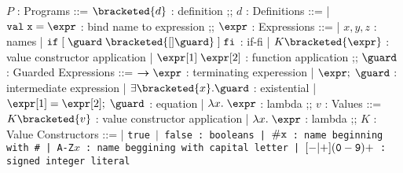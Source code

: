 \documentclass[]{article}
\begin{document}
\begin{center}
    \begin{bnf}
    $P$ : \textsf{Programs} ::=
    $\bracketed{d}$ : definition
    ;;
    $d$ : \textsf{Definitions} ::=
    | $\tt{val} \; x \; \tt{=} \; \expr$ : bind name to expression
    ;;
    $\expr$ : \textsf{Expressions} ::=
    | $x, y, z$ : names
    | $\tt{if} \; \tt{[}\; \guard \; \bracketed{[] \guard} \;\tt{]} \; \tt{fi}$ : if-fi 
    | $K \bracketed{\expr}$ : value constructor application 
    | $\expr[1] \; \expr[2]$ : function application 
    ;;
    $\guard$ : \textsf{Guarded Expressions} ::=  
    $\boldsymbol{\rightarrow}\expr$ : terminating experession
    | $\expr; \; \guard$ : intermediate expression 
    | $\exists \bracketed{x} \tt{.} \guard$ : existential 
    | $\expr[1] = \expr[2]; \; \guard$ : equation 
    | $\lambda x. \; \expr$ : lambda 
    ;;
    $v$ : Values ::= $K\bracketed{v}$ : value constructor application 
    | $\lambda x. \; \expr$ : lambda 
    ;;
    $K$ : \textsf{Value Constructors} ::=
    | \tt{true} $\vert$ \tt{false} : booleans
    | $\tt{\#}x$ : name beginning with \tt{\#}
    | \tt{A-Z}$x$ : name beggining with capital letter
    | $[\tt{-}\vert\tt{+}](\tt{0}-\tt{9})+$ : signed integer literal 
    \end{bnf}
\end{center}

\end{document}
